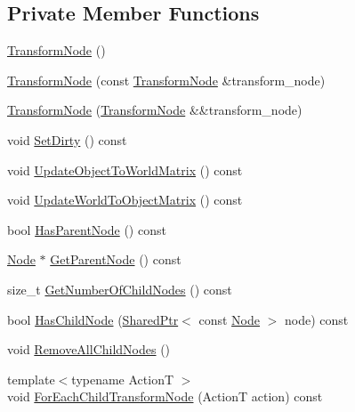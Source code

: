 \subsection*{Private Member Functions}
\begin{DoxyCompactItemize}
\item 
\hyperlink{classmage_1_1_transform_node_aec41a87ef5f7bca905e1de4b8959350a}{Transform\+Node} ()
\item 
\hyperlink{classmage_1_1_transform_node_a6ee41dcccf0aba7f904f1617444411d4}{Transform\+Node} (const \hyperlink{classmage_1_1_transform_node}{Transform\+Node} \&transform\+\_\+node)
\item 
\hyperlink{classmage_1_1_transform_node_ae9e2e7dafab6af1e4a400fa0b84eff35}{Transform\+Node} (\hyperlink{classmage_1_1_transform_node}{Transform\+Node} \&\&transform\+\_\+node)
\item 
void \hyperlink{classmage_1_1_transform_node_a333a00b67bde653ffe76b5fa6f240223}{Set\+Dirty} () const
\item 
void \hyperlink{classmage_1_1_transform_node_ac607aac55f3134bf57299d5874c9e9eb}{Update\+Object\+To\+World\+Matrix} () const
\item 
void \hyperlink{classmage_1_1_transform_node_afe8b6b5e882611e1b95bcc61b0db7b5c}{Update\+World\+To\+Object\+Matrix} () const
\item 
bool \hyperlink{classmage_1_1_transform_node_a2ab56beff5c89ba174981d5c87af056e}{Has\+Parent\+Node} () const
\item 
\hyperlink{classmage_1_1_node}{Node} $\ast$ \hyperlink{classmage_1_1_transform_node_ad7b40df4dd3d8973382c8a7fe36323b6}{Get\+Parent\+Node} () const
\item 
size\+\_\+t \hyperlink{classmage_1_1_transform_node_a6d9c5c9f5ce1ee9ebf47bc7427f4fdd8}{Get\+Number\+Of\+Child\+Nodes} () const
\item 
bool \hyperlink{classmage_1_1_transform_node_ac83d9d2013494588fb45a469057b18f6}{Has\+Child\+Node} (\hyperlink{namespacemage_a1e01ae66713838a7a67d30e44c67703e}{Shared\+Ptr}$<$ const \hyperlink{classmage_1_1_node}{Node} $>$ node) const
\item 
void \hyperlink{classmage_1_1_transform_node_a8974e931f8fd7fb157ba1624405774d0}{Remove\+All\+Child\+Nodes} ()
\item 
{\footnotesize template$<$typename ActionT $>$ }\\void \hyperlink{classmage_1_1_transform_node_ad9c166b58e3718125d2a51827f8d7ca2}{For\+Each\+Child\+Transform\+Node} (ActionT action) const
\item 

\end{DoxyCompactItemize}
